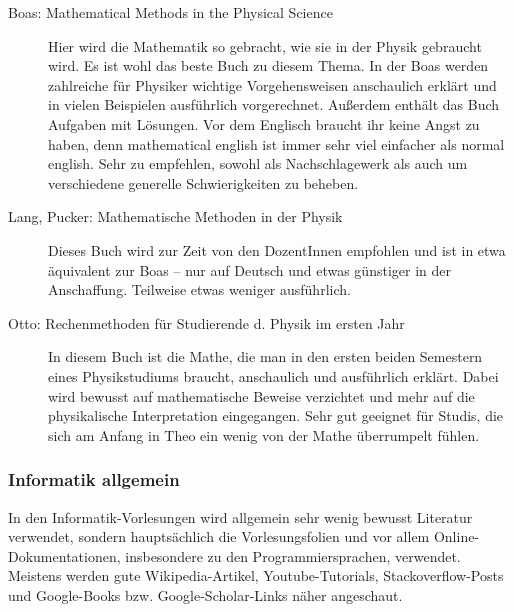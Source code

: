 \begin{description}
\item[Boas: Mathematical Methods in the Physical Science]{
		Hier wird die Mathematik so gebracht, wie sie in der Physik gebraucht wird. Es ist wohl das beste Buch zu diesem Thema. In der Boas werden zahlreiche für Physiker wichtige Vorgehensweisen anschaulich erklärt und in vielen Beispielen ausführlich vorgerechnet. Außerdem enthält das Buch Aufgaben mit Lösungen. Vor dem Englisch braucht ihr keine Angst zu haben, denn mathematical english ist immer sehr viel einfacher als normal english. Sehr zu empfehlen, sowohl als Nachschlagewerk als auch um verschiedene generelle Schwierigkeiten zu beheben.}

\item[Lang, Pucker: Mathematische Methoden in der Physik]{
		Dieses Buch wird zur Zeit von den DozentInnen empfohlen und ist in etwa äquivalent zur Boas -- nur auf Deutsch und etwas günstiger in der Anschaffung. Teilweise etwas weniger ausführlich.}

\item[Otto: Rechenmethoden für Studierende d. Physik im ersten Jahr]{
		In diesem Buch ist die Mathe, die man in den ersten beiden Semestern eines Physikstudiums braucht, anschaulich und ausführlich erklärt. Dabei wird bewusst auf mathematische Beweise verzichtet und mehr auf die physikalische Interpretation eingegangen. Sehr gut geeignet für Studis, die sich am Anfang in Theo ein wenig von der Mathe überrumpelt fühlen.}
\end{description}

\subsubsection*{Informatik allgemein}

In den Informatik-Vorlesungen wird allgemein sehr wenig bewusst Literatur verwendet,
sondern hauptsächlich die Vorlesungsfolien und vor allem Online-Dokumentationen,
insbesondere zu den Programmiersprachen, verwendet. Meistens werden gute Wikipedia-Artikel,
Youtube-Tutorials, Stackoverflow-Posts und Google-Books bzw. Google-Scholar-Links näher angeschaut. 

